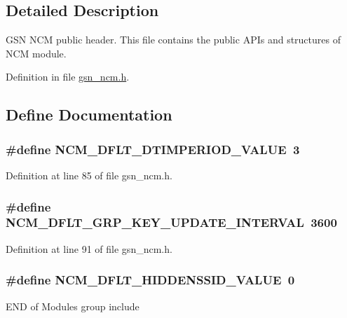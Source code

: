 \subsection{Detailed Description}
GSN NCM public header. This file contains the public APIs and structures of NCM module. 

Definition in file \hyperlink{a00529_source}{gsn\_\-ncm.h}.



\subsection{Define Documentation}
\hypertarget{a00529_a5fb27317dccb3b61dcc8bd59522c849f}{
\subsubsection[{NCM\_\-DFLT\_\-DTIMPERIOD\_\-VALUE}]{\setlength{\rightskip}{0pt plus 5cm}\#define NCM\_\-DFLT\_\-DTIMPERIOD\_\-VALUE~3}}
\label{a00529_a5fb27317dccb3b61dcc8bd59522c849f}


Definition at line 85 of file gsn\_\-ncm.h.

\hypertarget{a00529_a6f9abd3777110673629c1ccc4f63ff05}{
\subsubsection[{NCM\_\-DFLT\_\-GRP\_\-KEY\_\-UPDATE\_\-INTERVAL}]{\setlength{\rightskip}{0pt plus 5cm}\#define NCM\_\-DFLT\_\-GRP\_\-KEY\_\-UPDATE\_\-INTERVAL~3600}}
\label{a00529_a6f9abd3777110673629c1ccc4f63ff05}


Definition at line 91 of file gsn\_\-ncm.h.

\hypertarget{a00529_a4d23ec736944f85655e86e558fd07a4d}{
\subsubsection[{NCM\_\-DFLT\_\-HIDDENSSID\_\-VALUE}]{\setlength{\rightskip}{0pt plus 5cm}\#define NCM\_\-DFLT\_\-HIDDENSSID\_\-VALUE~0}}
\label{a00529_a4d23ec736944f85655e86e558fd07a4d}
END of Modules group include 

